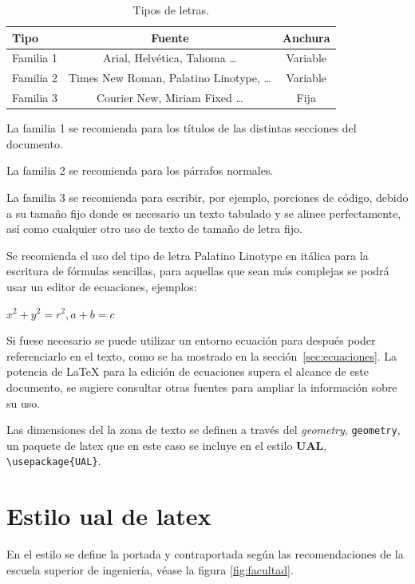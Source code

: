 \begin{table}
	\begin{center}
	\begin{tabular}{l c c}
		\textbf{Tipo} & \textbf{Fuente} & \textbf{Anchura} \\ \hline
         Familia 1 & Arial, Helvética, Tahoma  	\ldots & Variable \\
         Familia 2 & Times New Roman, Palatino  Linotype,  	\ldots & Variable  \\
         Familia 3 & Courier  New,  Miriam Fixed \ldots & Fija \\
         \hline
	\end{tabular}
	\end{center}

	\caption{\label{tab:letras}Tipos de letras.}
\end{table}


La familia 1 se recomienda para los títulos de las distintas secciones del documento.

La familia 2 se recomienda para los párrafos normales.

La familia 3 se recomienda para escribir, por ejemplo, porciones de código, debido a su tamaño fijo donde es necesario un texto tabulado y se alinee perfectamente, así como cualquier otro uso de texto de tamaño de letra fijo.

Se recomienda el uso del tipo de letra Palatino Linotype en itálica para la escritura de fórmulas sencillas, para aquellas que sean más complejas se podrá usar un editor de ecuaciones, ejemplos:

$ x^2+y^2=r^2,    a+b=c$

Si fuese necesario se puede utilizar un entorno ecuación para después poder referenciarlo en el texto, como se ha mostrado en la sección~\ref{sec:ecuaciones}. La potencia de \LaTeX{} para la edición de ecuaciones supera el alcance de este documento, se sugiere consultar otras fuentes para ampliar la información sobre su uso.

Las dimensiones del la zona de texto se definen a través del \emph{geometry}, \lstinline[language=enparrafo]!geometry!, un paquete de latex que en este caso se incluye en el estilo \textbf{UAL}, \lstinline[language=enparrafo]!\usepackage{UAL}!.

\section {Estilo ual de latex}

En el estilo se define la portada y contraportada según las recomendaciones de la escuela superior de ingeniería, véase la figura \ref{fig:facultad}.

